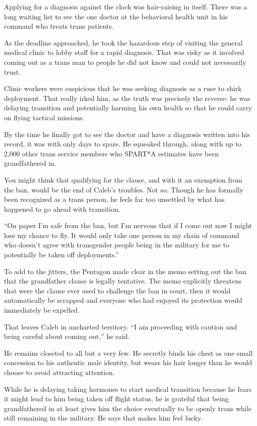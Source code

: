 Applying for a diagnosis against the clock was hair-raising in itself. There was a long waiting list to see the one doctor at the behavioral health unit in his command who treats trans patients.

As the deadline approached, he took the hazardous step of visiting the general medical clinic to lobby staff for a rapid diagnosis. That was risky as it involved coming out as a trans man to people he did not know and could not necessarily trust.

Clinic workers were suspicious that he was seeking diagnosis as a ruse to shirk deployment. That really irked him, as the truth was precisely the reverse: he was delaying transition and potentially harming his own health so that he could carry on flying tactical missions.

By the time he finally got to see the doctor and have a diagnosis written into his record, it was with only days to spare. He squeaked through, along with up to 2,000 other trans service members who SPART*A estimates have been grandfathered in.

You might think that qualifying for the clause, and with it an exemption from the ban, would be the end of Caleb’s troubles. Not so. Though he has formally been recognized as a trans person, he feels far too unsettled by what has happened to go ahead with transition.

“On paper I’m safe from the ban, but I’m nervous that if I come out now I might lose my chance to fly. It would only take one person in my chain of command who doesn’t agree with transgender people being in the military for me to potentially be taken off deployments.”

To add to the jitters, the Pentagon made clear in the memo setting out the ban that the grandfather clause is legally tentative. The memo explicitly threatens that were the clause ever used to challenge the ban in court, then it would automatically be scrapped and everyone who had enjoyed its protection would immediately be expelled.

That leaves Caleb in uncharted territory. “I am proceeding with caution and being careful about coming out,” he said.

He remains closeted to all but a very few. He secretly binds his chest as one small concession to his authentic male identity, but wears his hair longer than he would choose to avoid attracting attention.

While he is delaying taking hormones to start medical transition because he fears it might lead to him being taken off flight status, he is grateful that being grandfathered in at least gives him the choice eventually to be openly trans while still remaining in the military. He says that makes him feel lucky.

